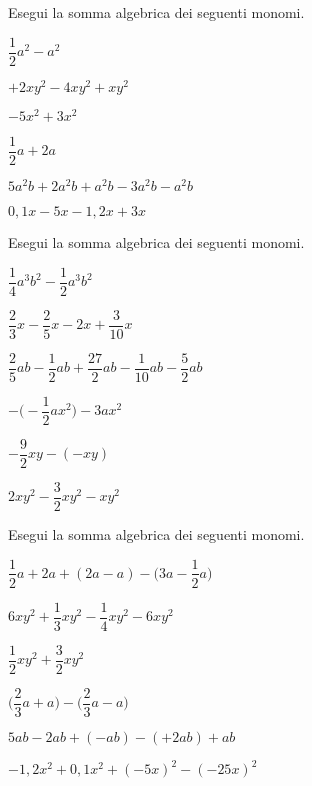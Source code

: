 \begin{esercizio}
 \label{ese:9.28}
Esegui la somma algebrica dei seguenti monomi.
\begin{multicols}{2}
\begin{enumeratea}
 \item \(\dfrac{1}{2}a^{2}-a^{2}\)
 \item \(+2xy^{2}-4xy^{2}+xy^{2}\)
 \item \(-5x^{2}+3x^{2}\)
 \item \(\dfrac{1}{2}a+2a\)
 \item \(5a^{2}b+2a^{2}b+a^{2}b-3a^{2}b-a^{2}b\)
 \item \(0,1x-5x-1,2x+3x\)
\end{enumeratea}
\end{multicols}
\end{esercizio}

\begin{esercizio}
 \label{ese:9.29}
Esegui la somma algebrica dei seguenti monomi.
\begin{multicols}{2}
\begin{enumeratea}
\spazielenx
 \item \(\dfrac{1}{4}a^{3}b^{2}-\dfrac{1}{2}a^{3}b^{2}\)
 \item \(\dfrac{2}{3}x-\dfrac{2}{5}x-2x+\dfrac{3}{10}x\)
 \item 
\(\dfrac{2}{5}ab-\dfrac{1}{2}ab+\dfrac{27}{2}ab-\dfrac{1}{10}ab-\dfrac{5}{2}ab\)
 \item \(-\bigg(-{\dfrac{1}{2}}ax^{2}\bigg)-3ax^{2}\)
 \item \(-{\dfrac{9}{2}}xy-(-xy)\)
 \item \(2xy^{2}-\dfrac{3}{2}xy^{2}-xy^{2}\)
\end{enumeratea}
\end{multicols}
\end{esercizio}

\begin{esercizio}
 \label{ese:9.30}
Esegui la somma algebrica dei seguenti monomi.
\begin{multicols}{2}
\begin{enumeratea}
\spazielenx
 \item \(\dfrac{1}{2}a+2a+(2a-a)-\bigg(3a-\dfrac{1}{2}a\bigg)\)
 \item \(6xy^{2}+\dfrac{1}{3}xy^{2}-\dfrac{1}{4}xy^{2}-6xy^{2}\)
 \item \(\dfrac{1}{2}xy^{2}+\dfrac{3}{2}xy^{2}\)
 \item \(\bigg(\dfrac{2}{3}a+a\bigg)-\bigg(\dfrac{2}{3}a-a\bigg)\)
 \item \(5ab-2ab+(-ab)-(+2ab)+ab\)
 \item \(-1,2x^{2}+0,1x^{2}+(-5x)^{2}-(-25x)^{2}\)
\end{enumeratea}
\end{multicols}

\end{esercizio}


